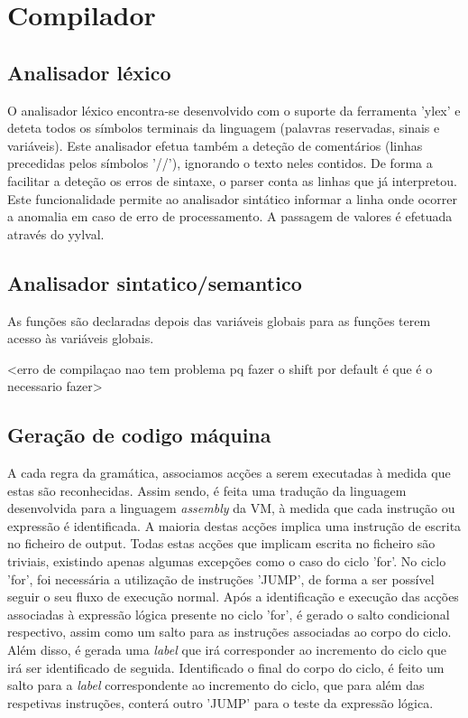 \documentclass[a4paper,10pt]{report}
\begin{document}
\chapter{Compilador}


\section{Analisador léxico}
  O analisador léxico encontra-se desenvolvido com o suporte da ferramenta 'ylex' e deteta todos os símbolos terminais da linguagem (palavras reservadas, sinais e variáveis). Este analisador efetua também a deteção de comentários (linhas precedidas pelos símbolos '//'), ignorando o texto neles contidos. De forma a facilitar a deteção os erros de sintaxe, o parser conta as linhas que já interpretou. Este funcionalidade permite ao analisador sintático informar a linha onde ocorrer a anomalia em caso de erro de processamento. A passagem de valores é efetuada através do yylval.  

\section{Analisador sintatico/semantico}

As funções são declaradas depois das variáveis globais para as funções terem acesso às variáveis globais.

<erro de compilaçao nao tem problema pq fazer o shift por default é que é o necessario fazer>


\section{Geração de codigo máquina}
    A cada regra da gramática, associamos acções a serem executadas à medida que estas são reconhecidas. Assim sendo, é feita uma tradução da linguagem desenvolvida para a linguagem \emph{assembly} da VM, à medida que cada instrução ou expressão é identificada. A maioria destas acções implica uma instrução de escrita no ficheiro de output. Todas estas acções que implicam escrita no ficheiro são triviais, existindo apenas algumas excepções como o caso do ciclo 'for'.
	No ciclo 'for', foi necessária a utilização de instruções 'JUMP', de forma a ser possível seguir o seu fluxo de execução normal. Após a identificação e execução das acções associadas à expressão lógica presente no ciclo 'for', é gerado o salto condicional respectivo, assim como um salto para as instruções associadas ao corpo do ciclo. Além disso, é gerada uma \emph{label} que irá corresponder ao incremento do ciclo que irá ser identificado de seguida. Identificado o final do corpo do ciclo, é feito um salto para a \emph{label} correspondente ao incremento do ciclo, que para além das respetivas instruções, conterá outro 'JUMP' para o teste da expressão lógica.
\end{document}
